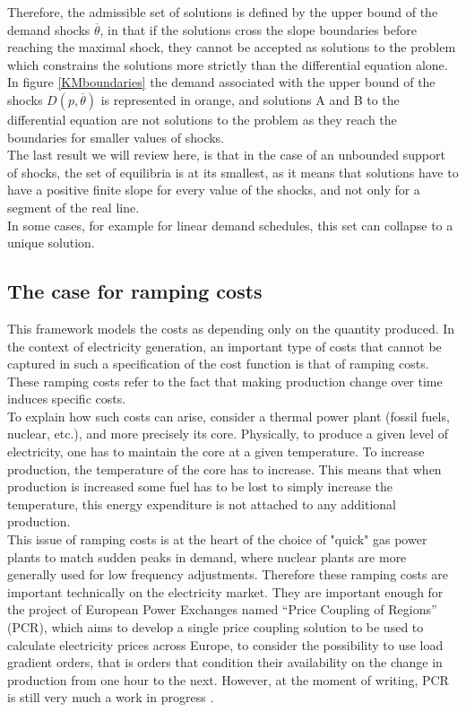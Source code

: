 Therefore, the admissible set of solutions is defined by the upper bound of the demand shocks $\overline{\theta}$, in that if the solutions cross the slope boundaries before reaching the maximal shock, they cannot be accepted as solutions to the problem which constrains the solutions more strictly than the differential equation alone. In figure \ref{KMboundaries} the demand associated with the upper bound of the shocks $D(p,\overline{\theta})$ is represented in orange, and solutions A and B to the differential equation are not solutions to the problem as they reach the boundaries for smaller values of shocks.\\

The last result we will review here, is that in the case of an unbounded support of shocks, the set of equilibria is at its smallest, as it means that solutions have to have a positive finite slope for every value of the shocks, and not only for a segment of the real line. \\

In some cases, for example for linear demand schedules, this set can collapse to a unique solution. \\

\subsection*{The case for ramping costs}

This framework models the costs as depending only on the quantity produced. In the context of electricity generation, an important type of costs that cannot be captured in such a specification of the cost function is that of ramping costs. These ramping costs refer to the fact that making production change over time induces specific costs.\\

To explain how such costs can arise, consider a thermal power plant (fossil fuels, nuclear, etc.), and more precisely its core. Physically, to produce a given level of electricity, one has to maintain the core at a given temperature. To increase production, the temperature of the core has to increase. This means that when production is increased some fuel has to be lost to simply increase the temperature, this energy expenditure is not attached to any additional production.\\

This issue of ramping costs is at the heart of the choice of "quick" gas power plants to match sudden peaks in demand, where nuclear plants are more generally used for low frequency adjustments. Therefore these ramping costs are important technically on the electricity market. They are important enough for the project of European Power Exchanges named ``Price Coupling of Regions'' (PCR), which aims to develop a single price coupling solution to be used to calculate electricity prices across Europe, to consider the possibility to use load gradient orders, that is orders that condition their availability on the change in production from one hour to the next. However, at the moment of writing, PCR is still very much a work in progress \cite{EPEXPCR}.\\

